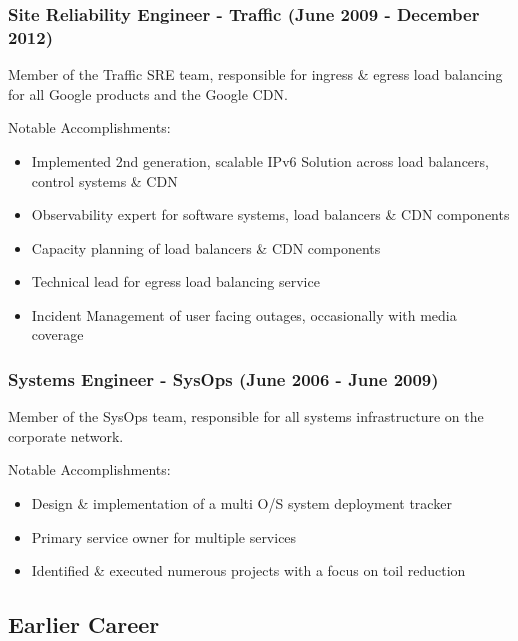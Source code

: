 \documentclass[a4paper, 10pt] {article}
\begin{document}
\subsubsection*{Site Reliability Engineer - Traffic (June 2009 - December 2012)}

Member of the Traffic SRE team, responsible for ingress \& egress load balancing for all Google products and the Google CDN. 

\vspace{3mm}  %

Notable Accomplishments:

\begin{itemize}
  \item Implemented 2nd generation, scalable IPv6 Solution across load balancers, control systems \& CDN
  \item Observability expert for software systems, load balancers \& CDN components
  \item Capacity planning of load balancers \& CDN components
  \item Technical lead for egress load balancing service
  \item Incident Management of user facing outages, occasionally with media coverage
\end{itemize}

\subsubsection*{Systems Engineer - SysOps (June 2006 - June 2009)}

Member of the SysOps team, responsible for all systems infrastructure on the corporate network.

\vspace{3mm}  %

Notable Accomplishments:

\begin{itemize}
  \item Design \& implementation of a multi O/S system deployment tracker
  \item Primary service owner for multiple services
  \item Identified \& executed numerous projects with a focus on toil reduction
\end{itemize}

\subsection*{Earlier Career}
\end{document}
